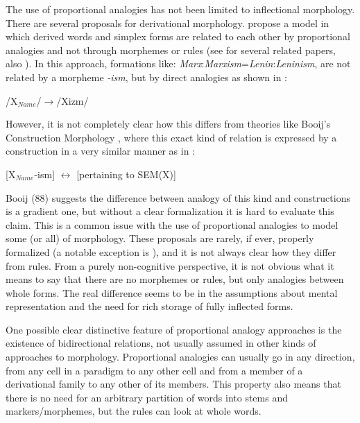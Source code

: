 The use of proportional analogies has not been limited to inflectional morphology. There are several proposals for derivational morphology. \textcite{Singh.2003a} propose a model in which derived words and simplex forms are related to each other by proportional analogies and not through morphemes or rules (see \citealt{Singh.2003} for several related papers, also \citealt{Neuvel.2001}). In this approach, formations like: \textit{Marx}:\textit{Marxism}=\-\textit{Lenin}:\textit{Leninism}, are not related by a morpheme \textit{-ism}, but by direct analogies as shown in :

\begin{exe}
    \ex \label{analogy-derivation-ism} /X$_{Name}$/$\rightarrow$/Xizm/
\end{exe}

However, it is not completely clear how this differs from theories like Booij's Construction Morphology \autocite{Booij.2010}, where this exact kind of relation is expressed by a construction in a very similar manner as in :

\begin{exe}
    \ex \label{analogy-derivation-ism-cxt} [X$_{Name}$-ism] $\leftrightarrow$ [pertaining to SEM(X)]
\end{exe}

\largerpage
Booij (88) suggests the difference between analogy of this kind and constructions is a gradient one, but without a clear formalization it is hard to evaluate this claim. This is a common issue with the use of proportional analogies to model some (or all) of morphology. These proposals are rarely, if ever, properly formalized (a notable exception is \citealt{Beniamine.2017}), and it is not always clear how they differ from rules. From a purely non-cognitive perspective, it is not obvious what it means to say that there are no morphemes or rules, but only analogies between whole forms. The real difference seems to be in the assumptions about mental representation and the need for rich storage of fully inflected forms.

One possible clear distinctive feature of proportional analogy approaches is the existence of bidirectional relations, not usually assumed in other kinds of approaches to morphology. Proportional analogies can usually go in any direction, from any cell in a paradigm to any other cell and from a member of a derivational family to any other of its members. This property also means that there is no need for an arbitrary partition of words into stems and markers/morphemes, but the rules can look at whole words.

